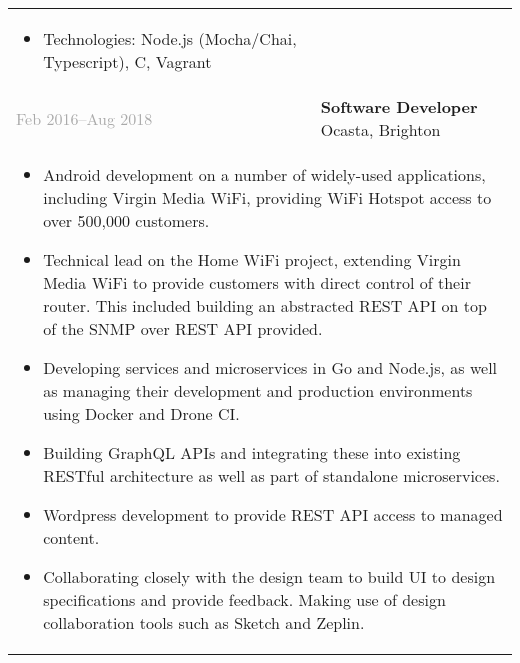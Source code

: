 \documentclass{article}
\newenvironment{exptable}{
  \begin{longtable}{lp{0.8\textwidth}}
  }{
  \end{longtable}
}
\begin{document}
\begin{exptable}
{        \vspace{1em}

        \begin{itemize}[leftmargin=1em]
          \item[] Technologies: Node.js (Mocha/Chai, Typescript), C, Vagrant
        \end{itemize}
      } \\
      \textcolor{darkgray}{Feb 2016--Aug 2018} & \textbf{Software Developer} Ocasta, Brighton \\
      \multicolumn{2}{p{\textwidth}}{
        \begin{itemize}
          \item Android development on a number of widely-used applications, including Virgin Media WiFi, providing WiFi Hotspot access to over 500,000 customers.
          \item Technical lead on the Home WiFi project, extending Virgin Media WiFi to provide customers with direct control of their router. This included building an abstracted REST API on top of the SNMP over REST API provided.
          \item Developing services and microservices in Go and Node.js, as well as managing their development and production environments using Docker and Drone CI.
          \item Building GraphQL APIs and integrating these into existing RESTful architecture as well as part of standalone microservices.
          \item Wordpress development to provide REST API access to managed content.
          \item Collaborating closely with the design team to build UI to design specifications and provide feedback. Making use of design collaboration tools such as Sketch and Zeplin.
        \end{itemize}

        \vspace{1em}

}
\end{exptable}
\end{document}
